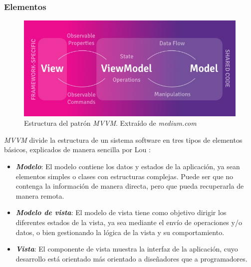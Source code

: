 \subsubsection{Elementos}
\begin{figure}[H]
	\centering
	\includegraphics[scale=0.3]{Figures/mvvm_flow.png}
	\caption{Estructura del patrón \textit{MVVM}. Extraído de \textit{medium.com} \autocite*{MvvmFlowDiagram}}
	\label{Estructura_mvvm}
\end{figure}
\newpage
\textit{MVVM} divide la estructura de un sistema software en tres tipos de elementos básicos, explicados de manera 
sencilla por Lou \autocite*{Lou2016}:
\begin{itemize}

    \item \textit{\textbf{Modelo}}: El modelo contiene los datos y estados de la aplicación, ya sean elementos 
    simples o clases con estructuras complejas. Puede ser que no contenga la información de manera directa, pero 
    que pueda recuperarla de manera remota. 

    \item \textit{\textbf{Modelo de vista}}: El modelo de vista tiene como objetivo dirigir los diferentes 
    estados de la vista, ya sea mediante el envío de operaciones y/o datos, o bien gestionando la lógica de la 
    vista y su comportamiento.
    
    \item \textit{\textbf{Vista}}: El componente de vista muestra la interfaz de la 
    aplicación, cuyo desarrollo está orientado más orientado a diseñadores que a programadores.

\end{itemize}
